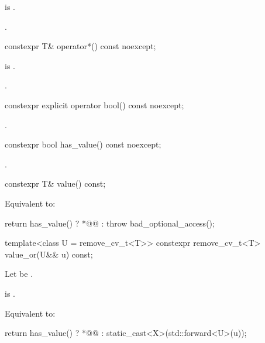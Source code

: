 \begin{itemdescr}
\pnum
\hardexpects
{} is .

\pnum
\returns
{}.

\end{itemdescr}

\begin{itemdecl}
constexpr T& operator*() const noexcept;
\end{itemdecl}

\begin{itemdescr}
\pnum
\hardexpects
{} is .

\pnum
\returns
{}.
\end{itemdescr}

\begin{itemdecl}
constexpr explicit operator bool() const noexcept;
\end{itemdecl}

\begin{itemdescr}
\pnum
\returns
{}.
\end{itemdescr}

\begin{itemdecl}
constexpr bool has_value() const noexcept;
\end{itemdecl}

\begin{itemdescr}
\pnum
\returns
{}.
\end{itemdescr}

\begin{itemdecl}
constexpr T& value() const;
\end{itemdecl}

\begin{itemdescr}
\pnum
\effects
Equivalent to:
\begin{codeblock}
return has_value() ? *@@ : throw bad_optional_access();
\end{codeblock}
\end{itemdescr}

\begin{itemdecl}
template<class U = remove_cv_t<T>> constexpr remove_cv_t<T> value_or(U&& u) const;
\end{itemdecl}

\begin{itemdescr}
\pnum
 Let  be .

\pnum
\mandates
{} is .

\pnum
\effects
 Equivalent to:
\begin{codeblock}
return has_value() ? *@@ : static_cast<X>(std::forward<U>(u));
\end{codeblock}
\end{itemdescr}

